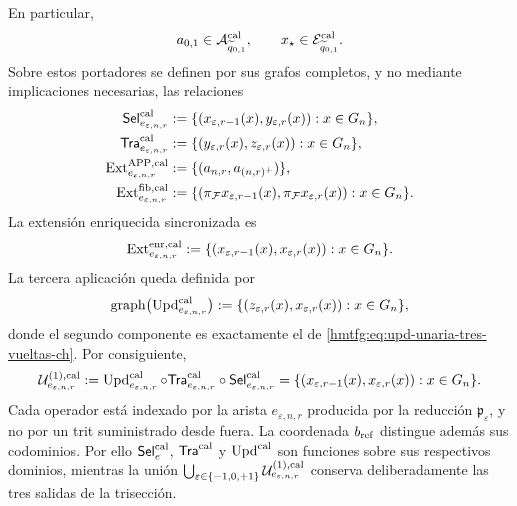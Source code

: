 En particular,
\[
 a_{0,1}\in\mathcal A^{\rm cal}_{\widetilde q_{0,1}},
 \qquad
 x_\star\in\mathcal E^{\rm cal}_{\widetilde q_{0,1}}.
\]
Sobre estos portadores se
definen por sus grafos completos, y no mediante implicaciones necesarias, las
relaciones
\begin{align}
 \mathsf{Sel}^{\rm cal}_{e_{\varepsilon,n,r}}
   &:=\{(x_{\varepsilon,r-1}(x),y_{\varepsilon,r}(x)):
          x\in G_n\},\\
 \mathsf{Tra}^{\rm cal}_{e_{\varepsilon,n,r}}
   &:=\{(y_{\varepsilon,r}(x),z_{\varepsilon,r}(x)):
          x\in G_n\},\\
 \operatorname{Ext}^{\mathrm{APP},\rm cal}_{e_{\varepsilon,n,r}}
   &:=\{(a_{n,r},a_{(n,r)^+})\},
 \label{hmtfg:eq:ext-app-calibrada-ch}\\
 \operatorname{Ext}^{\rm fib,cal}_{e_{\varepsilon,n,r}}
   &:=\{(\pi_{\mathcal F}x_{\varepsilon,r-1}(x),
          \pi_{\mathcal F}x_{\varepsilon,r}(x)):x\in G_n\}.
 \label{hmtfg:eq:ext-fibra-calibrada-ch}
\end{align}
La extensión enriquecida sincronizada es
\begin{equation}
 \operatorname{Ext}^{\rm enr,cal}_{e_{\varepsilon,n,r}}
 :=\{(x_{\varepsilon,r-1}(x),x_{\varepsilon,r}(x)):
       x\in G_n\}.
 \label{hmtfg:eq:ext-enriquecida-calibrada-ch}
\end{equation}
La tercera aplicación queda definida por
\begin{equation}
 \operatorname{graph}
 \bigl(\operatorname{Upd}^{\rm cal}_{e_{\varepsilon,n,r}}\bigr)
 :=\{(z_{\varepsilon,r}(x),x_{\varepsilon,r}(x)):
       x\in G_n\},
 \label{hmtfg:eq:grafo-upd-calibrado-ch}
\end{equation}
donde el segundo componente es exactamente el de
\eqref{hmtfg:eq:upd-unaria-tres-vueltas-ch}. Por consiguiente,
\begin{equation}
 \mathcal U^{(1),\rm cal}_{e_{\varepsilon,n,r}}
 :=\operatorname{Upd}^{\rm cal}_{e_{\varepsilon,n,r}}\circ
   \mathsf{Tra}^{\rm cal}_{e_{\varepsilon,n,r}}\circ
   \mathsf{Sel}^{\rm cal}_{e_{\varepsilon,n,r}}
 =\{(x_{\varepsilon,r-1}(x),x_{\varepsilon,r}(x)):
      x\in G_n\}.
 \label{hmtfg:eq:transicion-cal-en-tpk-ch}
\end{equation}
Cada operador está indexado por la arista
\(e_{\varepsilon,n,r}\) producida por la reducción
\(\mathfrak p_\varepsilon\), y no por un trit suministrado desde fuera. La
coordenada \(b_{\rm ref}\) distingue además sus codominios. Por ello
\(\mathsf{Sel}^{\rm cal}_{e}\),
\(\mathsf{Tra}^{\rm cal}\) y \(\operatorname{Upd}^{\rm cal}\) son funciones
sobre sus respectivos dominios, mientras
la unión
\(\bigcup_{\varepsilon\in\{-1,0,+1\}}
\mathcal U^{(1),\rm cal}_{e_{\varepsilon,n,r}}\) conserva deliberadamente
las tres salidas de la trisección.

